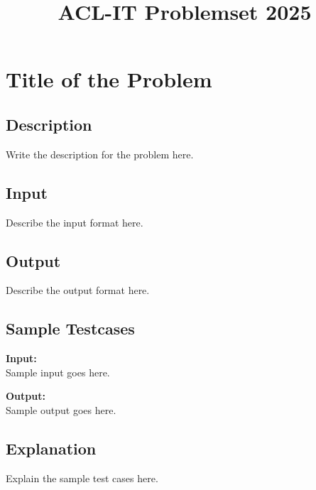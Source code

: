 \documentclass[12pt]{article}
\title{ACL-IT Problemset 2025}
\makeatletter
\newenvironment{problem}
{%
  \newcommand{\problemtitle}[1]{\def\@problemtitle{##1}}
  \newcommand{\problemdesc}[1]{\def\@problemdesc{##1}}
  \newcommand{\probleminput}[1]{\def\@probleminput{##1}}
  \newcommand{\problemoutput}[1]{\def\@problemoutput{##1}}
  \newcommand{\problemsamplein}[1]{\def\@problemsamplein{##1}}
  \newcommand{\problemsampleout}[1]{\def\@problemsampleout{##1}}
  \newcommand{\problemexplain}[1]{\def\@problemexplain{##1}}
  \def\@problemtitle{}
  \def\@problemdesc{}
  \def\@probleminput{}
  \def\@problemoutput{}
  \def\@problemsamplein{}
  \def\@problemsampleout{}
  \def\@problemexplain{}
}
{%
  \section*{\@problemtitle}

  \subsection*{Description}
  \@problemdesc

  \subsection*{Input}
  \@probleminput

  \subsection*{Output}
  \@problemoutput

  \subsection*{Sample Testcases}
  \textbf{Input:} \\
  \@problemsamplein

  \textbf{Output:} \\
  \@problemsampleout

  \subsection*{Explanation}
  \@problemexplain
}
\makeatother
\begin{document}
\maketitle

\begin{problem}
  \problemtitle{Title of the Problem}
  \problemdesc{Write the description for the problem here.}
  \probleminput{Describe the input format here.}
  \problemoutput{Describe the output format here.}
  \problemsamplein{Sample input goes here.}
  \problemsampleout{Sample output goes here.}
  \problemexplain{Explain the sample test cases here.}
\end{problem}
\end{document}
